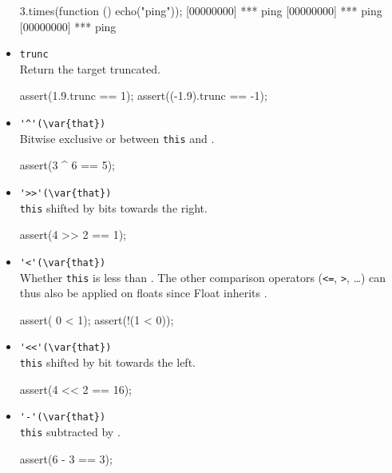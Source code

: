 \begin{itemize}
\begin{urbiscript}[firstnumber=last]
3.times(function () { echo("ping")});
[00000000] *** ping
[00000000] *** ping
[00000000] *** ping
\end{urbiscript}

\item \lstinline|trunc|\\
  Return the target truncated.
\begin{urbiscript}[firstnumber=last]
assert(1.9.trunc == 1);
assert((-1.9).trunc == -1);
\end{urbiscript}

\item \lstinline|'^'(\var{that})|\\
  Bitwise exclusive or between \lstinline|this| and .
\begin{urbiscript}[firstnumber=last]
assert(3 ^ 6 == 5);
\end{urbiscript}

\item \lstinline|'>>'(\var{that})|\\%
  \lstinline|this| shifted by  bits towards the right.
\begin{urbiscript}[firstnumber=last]
assert(4 >> 2 == 1);
\end{urbiscript}

\item \lstinline|'<'(\var{that})|\\
  Whether \lstinline|this| is less than . The other comparison
  operators (\lstinline|<=|, \lstinline|>|, \ldots) can thus also be
  applied on floats since Float inherits .
\begin{urbiscript}[firstnumber=last]
assert(  0 < 1);
assert(!(1 < 0));
\end{urbiscript}

\item \lstinline|'<<'(\var{that})|\\
  \lstinline|this| shifted by  bit towards the left.
\begin{urbiscript}[firstnumber=last]
assert(4 << 2 == 16);
\end{urbiscript}

\item \lstinline|'-'(\var{that})|\\
  \lstinline|this| subtracted by .
\begin{urbiscript}[firstnumber=last]
assert(6 - 3 == 3);
\end{urbiscript}


\end{itemize}
